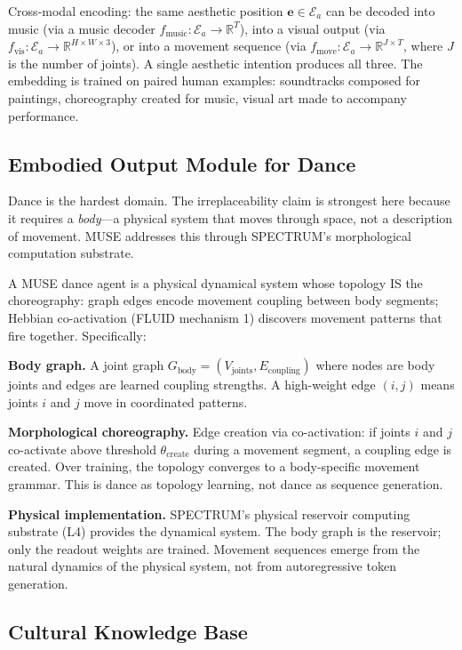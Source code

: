 \documentclass[12pt]{article}
\begin{document}
Cross-modal encoding: the same aesthetic position $\mathbf{e} \in \mathcal{E}_a$ can be decoded into music (via a music decoder $f_{\text{music}}: \mathcal{E}_a \to \mathbb{R}^T$), into a visual output (via $f_{\text{vis}}: \mathcal{E}_a \to \mathbb{R}^{H \times W \times 3}$), or into a movement sequence (via $f_{\text{move}}: \mathcal{E}_a \to \mathbb{R}^{J \times T}$, where $J$ is the number of joints). A single aesthetic intention produces all three. The embedding is trained on paired human examples: soundtracks composed for paintings, choreography created for music, visual art made to accompany performance.

\subsection{Embodied Output Module for Dance}

Dance is the hardest domain. The irreplaceability claim is strongest here because it requires a \textit{body}---a physical system that moves through space, not a description of movement. MUSE addresses this through SPECTRUM's morphological computation substrate.

A MUSE dance agent is a physical dynamical system whose topology IS the choreography: graph edges encode movement coupling between body segments; Hebbian co-activation (FLUID mechanism 1) discovers movement patterns that fire together. Specifically:

\textbf{Body graph.} A joint graph $G_{\text{body}} = (V_{\text{joints}}, E_{\text{coupling}})$ where nodes are body joints and edges are learned coupling strengths. A high-weight edge $(i, j)$ means joints $i$ and $j$ move in coordinated patterns.

\textbf{Morphological choreography.} Edge creation via co-activation: if joints $i$ and $j$ co-activate above threshold $\theta_{\text{create}}$ during a movement segment, a coupling edge is created. Over training, the topology converges to a body-specific movement grammar. This is dance as topology learning, not dance as sequence generation.

\textbf{Physical implementation.} SPECTRUM's physical reservoir computing substrate (L4) provides the dynamical system. The body graph is the reservoir; only the readout weights are trained. Movement sequences emerge from the natural dynamics of the physical system, not from autoregressive token generation.

\subsection{Cultural Knowledge Base}
\end{document}

